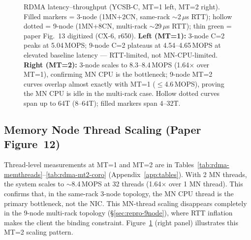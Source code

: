 \documentclass[conference]{IEEEtran}
\begin{document}
\begin{figure}[t]
\caption{RDMA latency--throughput (YCSB-C, MT=1 left, MT=2 right). Filled markers = 3-node (1MN+2CN, same-rack $\sim$2\,$\mu$s RTT); hollow dotted = 9-node (1MN+8CN, multi-rack $\sim$29\,$\mu$s RTT); thin green = paper Fig.~13 digitized (CX-6, r650). \textbf{Left (MT=1):} 3-node C=2 peaks at 5.04\,MOPS; 9-node C=2 plateaus at 4.54--4.65\,MOPS at elevated baseline latency --- RTT-limited, not MN-CPU-limited. \textbf{Right (MT=2):} 3-node scales to 8.3--8.4\,MOPS (1.64$\times$ over MT=1), confirming MN CPU is the bottleneck; 9-node MT=2 curves overlap almost exactly with MT=1 ($\leq$4.6\,MOPS), proving the MN CPU is idle in the multi-rack case. Hollow dotted curves span up to 64T (8--64T); filled markers span 4--32T.}
\label{fig:rdma-coro-latency}
\end{figure}

\subsection{Memory Node Thread Scaling (Paper Figure~12)}\label{sec:repro-mt}

Thread-level measurements at MT=1 and MT=2 are in Tables~\ref{tab:rdma-memthreads}--\ref{tab:rdma-mt2-coro} (Appendix~\ref{app:tables}). With 2 MN threads, the system scales to $\sim$8.4\,MOPS at 32 threads (1.64$\times$ over 1 MN thread). This confirms that, in the same-rack 3-node topology, the MN CPU thread is the primary bottleneck, not the NIC. This MN-thread scaling disappears completely in the 9-node multi-rack topology (\S\ref{sec:repro-9node}), where RTT inflation makes the client the binding constraint. Figure~\ref{fig:rdma-coro-latency} (right panel) illustrates this MT=2 scaling pattern.
\end{document}
